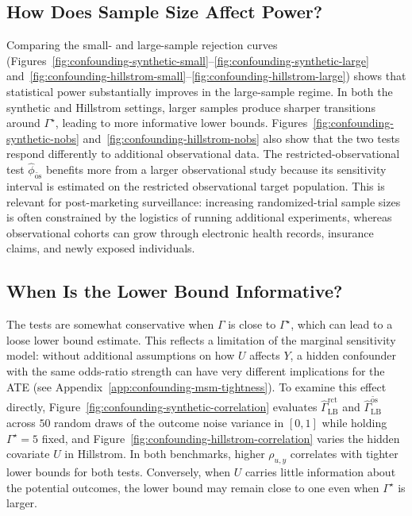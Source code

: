 \subsection{How Does Sample Size Affect Power?}

Comparing the small- and large-sample rejection curves (Figures~\ref{fig:confounding-synthetic-small}--\ref{fig:confounding-synthetic-large} and~\ref{fig:confounding-hillstrom-small}--\ref{fig:confounding-hillstrom-large}) shows that statistical power substantially improves in the large-sample regime. In both the synthetic and Hillstrom settings, larger samples produce sharper transitions around \(\Gamma^{\star}\), leading to more informative lower bounds. Figures~\ref{fig:confounding-synthetic-nobs} and~\ref{fig:confounding-hillstrom-nobs} also show that the two tests respond differently to additional observational data. The restricted-observational test \(\widehat{\phi}_{\widetilde{\mathrm{os}}}\) benefits more from a larger observational study because its sensitivity interval is estimated on the restricted observational target population. This is relevant for post-marketing surveillance: increasing randomized-trial sample sizes is often constrained by the logistics of running additional experiments, whereas observational cohorts can grow through electronic health records, insurance claims, and newly exposed individuals.

\subsection{When Is the Lower Bound Informative?}

The tests are somewhat conservative when \(\Gamma\) is close to \(\Gamma^{\star}\), which can lead to a loose lower bound estimate. This reflects a limitation of the marginal sensitivity model: without additional assumptions on how \(U\) affects \(Y\), a hidden confounder with the same odds-ratio strength can have very different implications for the ATE (see Appendix~\ref{app:confounding-msm-tightness}). To examine this effect directly, Figure~\ref{fig:confounding-synthetic-correlation} evaluates \(\widehat{\Gamma}_{\mathrm{LB}}^{\mathrm{rct}}\) and \(\widehat{\Gamma}_{\mathrm{LB}}^{\widetilde{\mathrm{os}}}\) across \(50\) random draws of the outcome noise variance in \([0,1]\) while holding \(\Gamma^{\star}=5\) fixed, and Figure~\ref{fig:confounding-hillstrom-correlation} varies the hidden covariate \(U\) in Hillstrom. In both benchmarks, higher \(\rho_{u,y}\) correlates with tighter lower bounds for both tests. Conversely, when \(U\) carries little information about the potential outcomes, the lower bound may remain close to one even when \(\Gamma^{\star}\) is larger.

